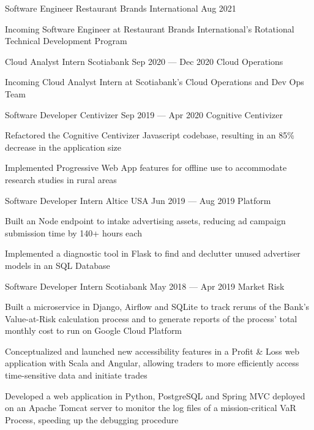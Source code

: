 \begin{cventries}
  \cventry
    {Software Engineer}
    {Restaurant Brands International}
    {}
    {Aug 2021}
    {}
    {
      \begin{cvitems}
        \item {Incoming Software Engineer at Restaurant Brands International's Rotational Technical Development Program}
      \end{cvitems}
    }
  \cventry
    {Cloud Analyst Intern}
    {Scotiabank}
    {}
    {Sep 2020 --- Dec 2020}
    {Cloud Operations}
    {
      \begin{cvitems}
        \item {Incoming Cloud Analyst Intern at Scotiabank's Cloud Operations and Dev Ops Team}
      \end{cvitems}
    }
  \cventry
    {Software Developer}
    {Centivizer}
    {}
    {Sep 2019 --- Apr 2020}
    {Cognitive Centivizer}
    {
      \begin{cvitems}
        \item {Refactored the Cognitive Centivizer Javascript codebase, resulting in an 85\% decrease in the application size}
        \item {Implemented Progressive Web App features for offline use to accommodate research studies in rural areas}
      \end{cvitems}
    }

  \cventry
    {Software Developer Intern}
    {Altice USA}
    {}
    {Jun 2019 --- Aug 2019}
    {Platform}
    {
    \begin{cvitems}
      \item {Built an Node endpoint to intake advertising assets, reducing ad campaign submission time by 140+ hours each}
      \item {Implemented a diagnostic tool in Flask to find and declutter unused advertiser models in an SQL Database}
    \end{cvitems}
    }

  \cventry
    {Software Developer Intern}
    {Scotiabank}
    {}
    {May 2018 --- Apr 2019}
    {Market Risk}
    {
      \begin{cvitems}
        \item {Built a microservice in Django, Airflow and SQLite to track reruns of the Bank's Value-at-Risk calculation process and to generate reports of the process' total monthly cost to run on Google Cloud Platform}
        \item {Conceptualized and launched new accessibility features in a Profit \& Loss web application with Scala and Angular, allowing traders to more efficiently access time-sensitive data and initiate trades}
        \item {Developed a web application in Python, PostgreSQL and Spring MVC deployed on an Apache Tomcat server to monitor the log files of a mission-critical VaR Process, speeding up the debugging procedure}
      \end{cvitems}
    }
\end{cventries}
